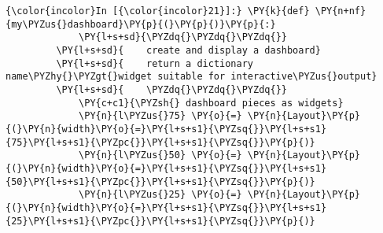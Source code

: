     \begin{Verbatim}[commandchars=\\\{\},frame=single,framerule=0.3mm,rulecolor=\color{cellframecolor}]
{\color{incolor}In [{\color{incolor}21}]:} \PY{k}{def} \PY{n+nf}{my\PYZus{}dashboard}\PY{p}{(}\PY{p}{)}\PY{p}{:}
             \PY{l+s+sd}{\PYZdq{}\PYZdq{}\PYZdq{}}
         \PY{l+s+sd}{    create and display a dashboard}
         \PY{l+s+sd}{    return a dictionary name\PYZhy{}\PYZgt{}widget suitable for interactive\PYZus{}output}
         \PY{l+s+sd}{    \PYZdq{}\PYZdq{}\PYZdq{}}
             \PY{c+c1}{\PYZsh{} dashboard pieces as widgets}
             \PY{n}{l\PYZus{}75} \PY{o}{=} \PY{n}{Layout}\PY{p}{(}\PY{n}{width}\PY{o}{=}\PY{l+s+s1}{\PYZsq{}}\PY{l+s+s1}{75}\PY{l+s+s1}{\PYZpc{}}\PY{l+s+s1}{\PYZsq{}}\PY{p}{)}
             \PY{n}{l\PYZus{}50} \PY{o}{=} \PY{n}{Layout}\PY{p}{(}\PY{n}{width}\PY{o}{=}\PY{l+s+s1}{\PYZsq{}}\PY{l+s+s1}{50}\PY{l+s+s1}{\PYZpc{}}\PY{l+s+s1}{\PYZsq{}}\PY{p}{)}
             \PY{n}{l\PYZus{}25} \PY{o}{=} \PY{n}{Layout}\PY{p}{(}\PY{n}{width}\PY{o}{=}\PY{l+s+s1}{\PYZsq{}}\PY{l+s+s1}{25}\PY{l+s+s1}{\PYZpc{}}\PY{l+s+s1}{\PYZsq{}}\PY{p}{)}
         

\end{Verbatim}

